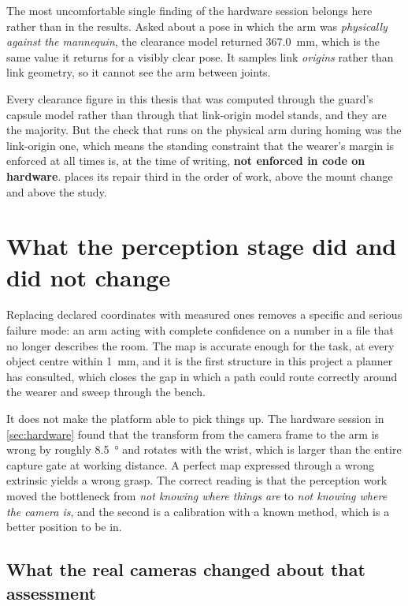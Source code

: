 The most uncomfortable single finding of the hardware session belongs here
rather than in the results. Asked about a pose in which the arm was
\emph{physically against the mannequin}, the clearance model returned
\SI{367.0}{\milli\metre}, which is the same value it returns for a visibly
clear pose. It samples link \emph{origins} rather than link geometry, so it
cannot see the arm between joints.

Every clearance figure in this thesis that was computed through the
guard's capsule model rather than through that link-origin model stands, and
they are the majority. But the check that runs on the physical arm during
homing was the link-origin one, which means the standing constraint that the
wearer's margin is enforced at all times is, at the time of writing,
\textbf{not enforced in code on hardware}.  places its
repair third in the order of work, above the mount change and above the study.

\section{What the perception stage did and did not change}

Replacing declared coordinates with measured ones removes a specific and
serious failure mode: an arm acting with complete confidence on a number in a
file that no longer describes the room. The map is accurate enough for the
task, at every object centre within \SI{1}{\milli\metre}, and it is the first
structure in this project a planner has consulted, which closes the gap in
which a path could route correctly around the wearer and sweep through the
bench.

It does not make the platform able to pick things up. The hardware session in
\cref{sec:hardware} found that the transform from the camera frame to the arm
is wrong by roughly \SI{8.5}{\degree} and rotates with the wrist, which is
larger than the entire capture gate at working distance. A perfect map
expressed through a wrong extrinsic yields a wrong grasp. The correct reading
is that the perception work moved the bottleneck from \emph{not knowing where
things are} to \emph{not knowing where the camera is}, and the second is a
calibration with a known method, which is a better position to be in.

\subsection{What the real cameras changed about that assessment}

